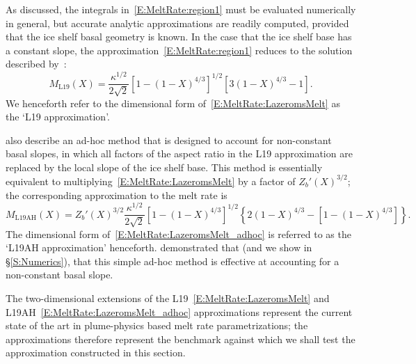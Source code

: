 \documentclass[openacc]{rsproca_new}%
\begin{document}
As discussed, the integrals in~\eqref{E:MeltRate:region1} must be evaluated numerically in general, but accurate analytic approximations are readily computed, provided that the ice shelf basal geometry is known. In the case that the ice shelf base has a constant slope, the approximation~\eqref{E:MeltRate:region1} reduces to the solution described by~\citet{Lazeroms2019JPhysOcean}:
\begin{equation}\label{E:MeltRate:LazeromsMelt}
M_{\text{L19}}(X) = \frac{\kappa^{1/2}}{2\sqrt{2}}\left[1 - (1 - X)^{4/3}\right]^{1/2}\left[3(1-X)^{4/3} - 1\right].
\end{equation}
We henceforth refer to the dimensional form of~\eqref{E:MeltRate:LazeromsMelt} as the `L19 approximation'. 

\citet{Lazeroms2019JPhysOcean} also describe an ad-hoc method that is designed to account for non-constant basal slopes, in which all factors of the aspect ratio in the L19 approximation are replaced by the local slope of the ice shelf base. This method is essentially equivalent to multiplying~\eqref{E:MeltRate:LazeromsMelt} by a factor of $Z_b'(X)^{3/2}$; the corresponding approximation to the melt rate is
\begin{equation}\label{E:MeltRate:LazeromsMelt_adhoc}
M_{\text{L19AH}}(X) =Z_b'(X)^{3/2} \frac{\kappa^{1/2}}{2\sqrt{2}}\left[1 - (1 - X)^{4/3}\right]^{1/2}\left\{2(1-X)^{4/3} - \left[1- (1 - X)^{4/3}\right]\right\}.
\end{equation}
The dimensional form of~\eqref{E:MeltRate:LazeromsMelt_adhoc} is referred to as the `L19AH approximation' henceforth. \citet{Lazeroms2019JPhysOcean} demonstrated that (and we show in \S\ref{S:Numerics}), that this simple ad-hoc method is effective at accounting for a non-constant basal slope.

The two-dimensional extensions of the L19~\eqref{E:MeltRate:LazeromsMelt} and L19AH~\eqref{E:MeltRate:LazeromsMelt_adhoc} approximations represent the current state of the art in plume-physics based melt rate parametrizations; the approximations therefore represent the benchmark against which we shall test the approximation constructed in this section.
\end{document}
